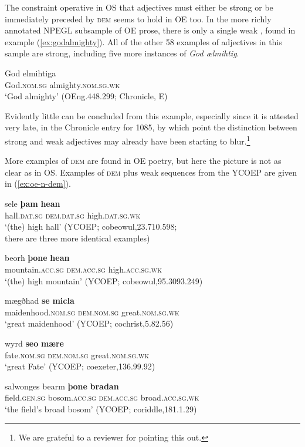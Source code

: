 \documentclass[output=paper,colorlinks,citecolor=brown]{langscibook}
\begin{document}
The constraint operative in OS that  adjectives must either be strong or be immediately preceded by \textsc{dem} seems to hold in OE too. In the more richly annotated NPEGL subsample of OE prose, there is only a single  weak , found in example (\ref{ex:godalmighty}). All of the other 58 examples of  adjectives in this sample are strong, including five more instances of \emph{God ælmihtig}.

\begin{exe}
  \ex\gll\label{ex:godalmighty}God elmihtiga\\
  God.\textsc{nom.sg} almighty.\textsc{nom.sg.wk}\\
  \glt `God almighty' (OEng.448.299; Chronicle, E)
\end{exe}

Evidently little can be concluded from this example, especially since it is attested very late, in the Chronicle entry for 1085, by which point the distinction between strong and weak adjectives may already have been starting to blur.\footnote{We are grateful to a reviewer for pointing this out.}

More examples of  \textsc{dem} are found in OE poetry, but here the picture is not as clear as in OS. Examples of  \textsc{dem} plus weak  sequences from the YCOEP \citep{YCOEP} are given in (\ref{ex:oe-n-dem}).

\begin{exe}
 \ex\label{ex:oe-n-dem}
 \begin{xlist}
  \ex\gll sele \textbf{þam} \textbf{hean}\\
  hall.\textsc{dat.sg} \textsc{dem.dat.sg} high.\textsc{dat.sg.wk}\\
  \glt `(the) high hall' (YCOEP; cobeowul,23.710.598; \\there are three more identical examples)
  
  \ex\gll beorh \textbf{þone} \textbf{hean}\\
  mountain.\textsc{acc.sg} \textsc{dem.acc.sg} high.\textsc{acc.sg.wk}\\
  \glt `(the) high mountain' (YCOEP; cobeowul,95.3093.249)
  
  \ex\gll mægðhad \textbf{se} \textbf{micla}\\
  maidenhood.\textsc{nom.sg} \textsc{dem.nom.sg} great.\textsc{nom.sg.wk}\\
  \glt `great maidenhood' (YCOEP; cochrist,5.82.56)
  
  \ex\gll wyrd \textbf{seo} \textbf{mære}\\
  fate.\textsc{nom.sg} \textsc{dem.nom.sg} great.\textsc{nom.sg.wk}\\
  \glt `great Fate' (YCOEP; coexeter,136.99.92)
  
  \ex\gll salwonges bearm \textbf{þone} \textbf{bradan}\\
  field.\textsc{gen.sg} bosom.\textsc{acc.sg} \textsc{dem.acc.sg} broad.\textsc{acc.sg.wk}\\
  \glt `the field's broad bosom' (YCOEP; coriddle,181.1.29)
 \end{xlist}
\end{exe}
\end{document}

